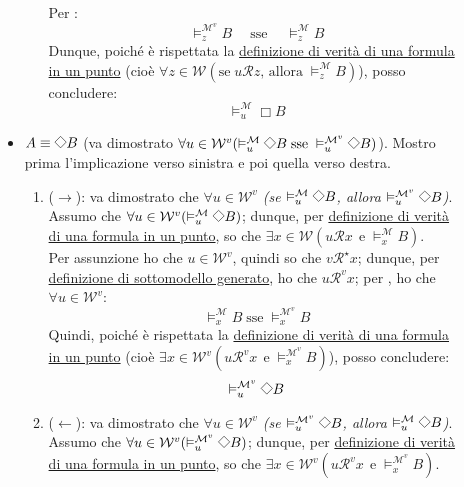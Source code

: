 \documentclass[a4paper,12pt]{article}
\newcommand{\latinmodern}[1]{\text{#1}}
\newcommand{\latinmath}[1]{\text{\latinmodern{#1}}} %
\newcommand{\Dmd}{\mathord{\vcenter{\hbox{\tikz[baseline=-0.6ex]{\draw[line width=0.4pt, scale=1, rotate=45] (0,0) rectangle (0.2,0.2);}}}}} %
\begin{document}
\begin{dimo}
\begin{description}
\begin{itemize}
\begin{enumerate}
				                  Per \latinmath{IH1}: $$\vDash_z^{\mathcal{M}^{v}} B \quad \; \text{sse} \quad \; \vDash_z^{\mathcal{M}} B$$
				                  Dunque, poiché è rispettata la \hyperlink{defverp}{definizione di verità di una formula in un punto} (cioè $\forall z \in \mathcal{W} (\text{se} \; u\mathcal{R}z \text{, allora} \; \vDash_z^{\mathcal{M}} B)$), posso concludere:
				                  $$\vDash_u^{\mathcal{M}} \Box B$$
			            \end{enumerate}
			      \item $A \equiv \Dmd B$ (va dimostrato \emph{$\forall u \in \mathcal{W}^{v} (\vDash_u^{\mathcal{M}} \Dmd B \; \text{sse} \; \vDash_u^{\mathcal{M}^{v}} \Dmd B)$}). Mostro prima l'implicazione verso sinistra e poi quella verso destra.
			            \begin{enumerate}
				            \item ($\to$): va dimostrato che \emph{$\forall u \in \mathcal{W}^{v}$ (se $\vDash_u^{\mathcal{M}} \Dmd B$, allora $\vDash_u^{\mathcal{M}^{v}} \Dmd B$)}. \\
				                  Assumo che $\forall u \in \mathcal{W}^{v} (\vDash_u^{\mathcal{M}} \Dmd B)$; dunque, per \hyperlink{defverp}{definizione di verità di una formula in un punto}, so che $\exists x \in \mathcal{W} (u\mathcal{R}x \;\, \text{e} \; \vDash_x^{\mathcal{M}} B)$. \\
				                  Per assunzione ho che $u \in \mathcal{W}^{v}$, quindi so che $v\mathcal{R}^{\star}x$; dunque, per \hyperlink{modgen}{definizione di sottomodello generato}, ho che $u\mathcal{R}^{v}x$; per \latinmath{IH1}, ho che $\forall u \in \mathcal{W}^{v}$:
				                  $$\vDash_x^{\mathcal{M}} B\; \text{sse} \; \vDash_x^{\mathcal{M}^{v}} B$$
				                  Quindi, poiché è rispettata la \hyperlink{defverp}{definizione di verità di una formula in un punto} (cioè $\exists x \in \mathcal{W}^{v}(u\mathcal{R}^{v}x \;\, \text{e} \; \vDash_x^{\mathcal{M}^{v}} B)$), posso concludere:
				                  $$\vDash_u^{\mathcal{M}^{v}} \Dmd B$$
				            \item ($\leftarrow$): va dimostrato che \emph{$\forall u \in \mathcal{W}^{v}$ (se $\vDash_u^{\mathcal{M}^{v}} \Dmd B$, allora $\vDash_u^{\mathcal{M}} \Dmd B$)}. \\
				                  Assumo che $\forall u \in \mathcal{W}^{v} (\vDash_u^{\mathcal{M}^{v}} \Dmd B)$; dunque, per \hyperlink{defverp}{definizione di verità di una formula in un punto}, so che $\exists x \in \mathcal{W}^{v} (u\mathcal{R}^{v}x \;\, \text{e} \; \vDash_x^{\mathcal{M}^{v}} B)$. \\

\end{enumerate}
\end{itemize}
\end{description}
\end{dimo}
\end{document}
